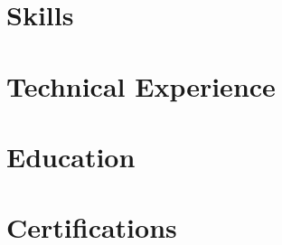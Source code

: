 \documentclass[letter,10pt]{article}
\begin{document}


\section{Skills}


\section{Technical Experience}


\section{Education}



\section{Certifications}

\end{document}
